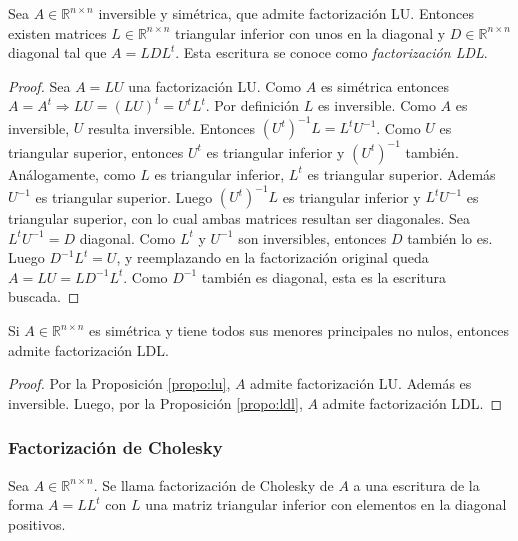 \begin{propo}
\label{propo:ldl}
Sea $A \in \mathbb{R}^{n \times n}$ inversible y simétrica, que admite factorización LU. Entonces existen matrices $L \in \mathbb{R}^{n \times n}$ triangular inferior con unos en la diagonal y $D \in \mathbb{R}^{n \times n}$ diagonal tal que $A = LDL^t$. Esta escritura se conoce como \textit{factorización LDL}.

\begin{proof}
Sea $A = LU$ una factorización LU. Como $A$ es simétrica entonces $A = A^t \Rightarrow LU = (LU)^t = U^t L^t$. Por definición $L$ es inversible. Como $A$ es inversible, $U$ resulta inversible. Entonces $(U^t)^{-1}L = L^t U^{-1}$. Como $U$ es triangular superior, entonces $U^t$ es triangular inferior y $(U^t)^{-1}$ también. Análogamente, como $L$ es triangular inferior, $L^t$ es triangular superior. Además $U^{-1}$ es triangular superior. Luego $(U^t)^{-1}L$ es triangular inferior y $L^t U^{-1}$ es triangular superior, con lo cual ambas matrices resultan ser diagonales. Sea $L^t U^{-1} = D$ diagonal. Como $L^t$ y $U^{-1}$ son inversibles, entonces $D$ también lo es. Luego $D^{-1}L^t = U$, y reemplazando en la factorización original queda $A = LU = LD^{-1}L^t$. Como $D^{-1}$ también es diagonal, esta es la escritura buscada.
\end{proof}
\end{propo}

\begin{coro}
\label{coro:ldl}
Si $A \in \mathbb{R}^{n \times n}$ es simétrica y tiene todos sus menores principales no nulos, entonces admite factorización LDL.

\begin{proof}
Por la Proposición \ref{propo:lu}, $A$ admite factorización LU. Además es inversible. Luego, por la Proposición \ref{propo:ldl}, $A$ admite factorización LDL.
\end{proof}
\end{coro}

\subsubsection{Factorización de Cholesky}

\begin{defi}
Sea $A \in \mathbb{R}^{n \times n}$. Se llama factorización de Cholesky de $A$ a una escritura de la forma $A = LL^t$ con $L$ una matriz triangular inferior con elementos en la diagonal positivos.
\end{defi}

